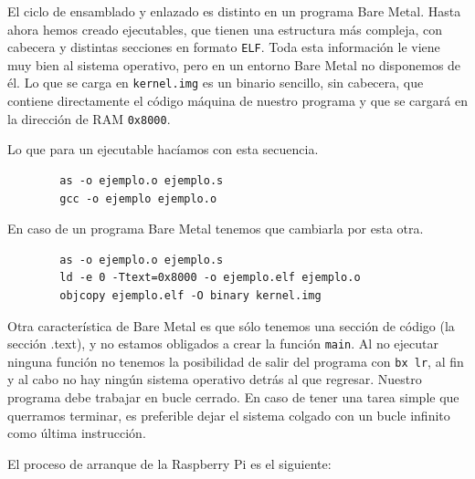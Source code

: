El ciclo de ensamblado y enlazado es distinto en un programa Bare Metal. Hasta
ahora hemos creado ejecutables, que tienen una estructura más compleja, con cabecera y
distintas secciones en formato {\tt ELF}. Toda esta información le viene muy bien al
sistema operativo, pero en un entorno Bare Metal no disponemos de él. Lo que se carga
en {\tt kernel.img} es un binario sencillo, sin cabecera, que contiene directamente
el código máquina de nuestro programa y que se cargará en la dirección de RAM {\tt 0x8000}.

Lo que para un ejecutable hacíamos con esta secuencia.
\begin{lstlisting}
        as -o ejemplo.o ejemplo.s
        gcc -o ejemplo ejemplo.o
\end{lstlisting}

En caso de un programa Bare Metal tenemos que cambiarla por esta otra.
\begin{lstlisting}
        as -o ejemplo.o ejemplo.s
        ld -e 0 -Ttext=0x8000 -o ejemplo.elf ejemplo.o
        objcopy ejemplo.elf -O binary kernel.img
\end{lstlisting}

Otra característica de Bare Metal es que sólo tenemos una sección de código (la sección
.text), y no estamos obligados a crear la función
{\tt main}. Al no ejecutar ninguna función no tenemos la posibilidad de salir del
programa con {\tt bx lr}, al fin y al cabo no hay ningún sistema operativo detrás al
que regresar. Nuestro programa debe trabajar en bucle cerrado. En caso de tener una
tarea simple que querramos terminar, es preferible dejar el sistema colgado con un
bucle infinito como última instrucción.

El proceso de arranque de la Raspberry Pi es el siguiente:

